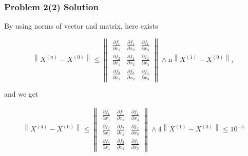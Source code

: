 \documentclass{beamer}
\begin{document}
\begin{frame}
\frametitle{Problem 2(2) Solution}
By using norms of vector and matrix, here exists

\begin{equation}
\left\|X^{(n)}-X^{(0)}\right\| \leq\left\|\begin{array}{lll}
\frac{\partial f_{1}}{\partial x_{1}} & \frac{\partial f_{1}}{\partial x_{2}} & \frac{\partial f_{1}}{\partial x_{3}} \\
\frac{\partial f_{2}}{\partial x_{1}} & \frac{\partial f_{2}}{\partial x_{2}} & \frac{\partial f_{2}}{\partial x_{3}} \\
\frac{\partial f_{3}}{\partial x_{1}} & \frac{\partial f_{3}}{\partial x_{2}} & \frac{\partial f_{3}}{\partial x_{3}}
\end{array}\right\| \wedge \mathrm{n}\left\|X^{(1)} - X^{(0)}\right\|,
\end{equation}

and we get

\begin{eqnarray}
\left\|X^{(4)}-X^{(0)}\right\| \leq\left\|\begin{array}{lll}
\frac{\partial f_{1}}{\partial x_{1}} & \frac{\partial f_{1}}{\partial x_{2}} & \frac{\partial f_{1}}{\partial x_{3}} \\
\frac{\partial f_{2}}{\partial x_{1}} & \frac{\partial f_{2}}{\partial x_{2}} & \frac{\partial f_{2}}{\partial x_{3}} \\
\frac{\partial f_{3}}{\partial x_{1}} & \frac{\partial f_{3}}{\partial x_{2}} & \frac{\partial f_{3}}{\partial x_{3}}
\end{array}\right\| \wedge 4\left\|X^{(1)} - X^{(0)}\right\| \leq 10^{-5}
\end{eqnarray}


\end{frame}
\end{document}
